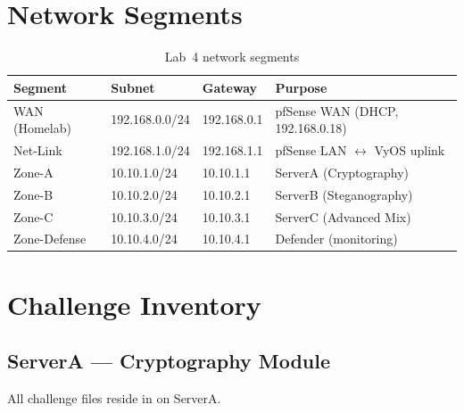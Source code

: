 \section*{Network Segments}

\begin{table}[H]
\centering
\begin{tabularx}{\textwidth}{lllX}
\toprule
\textbf{Segment} & \textbf{Subnet} & \textbf{Gateway} & \textbf{Purpose} \\
\midrule
WAN (Homelab) & 192.168.0.0/24   & 192.168.0.1    & pfSense WAN (DHCP, 192.168.0.18) \\
Net-Link      & 192.168.1.0/24   & 192.168.1.1    & pfSense LAN $\leftrightarrow$ VyOS uplink \\
Zone-A        & 10.10.1.0/24     & 10.10.1.1      & ServerA (Cryptography) \\
Zone-B        & 10.10.2.0/24     & 10.10.2.1      & ServerB (Steganography) \\
Zone-C        & 10.10.3.0/24     & 10.10.3.1      & ServerC (Advanced Mix) \\
Zone-Defense  & 10.10.4.0/24     & 10.10.4.1      & Defender (monitoring) \\
\bottomrule
\end{tabularx}
\caption{Lab~4 network segments}
\label{tab:lab4-segments}
\end{table}

\section*{Challenge Inventory}

\subsection*{ServerA --- Cryptography Module}

All challenge files reside in  on ServerA.

